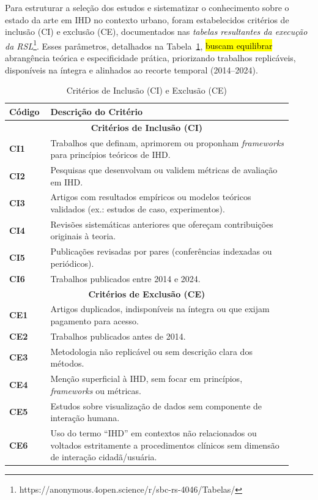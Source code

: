 \documentclass[12pt]{article}
\begin{document}
  Para estruturar a seleção dos estudos e sistematizar o conhecimento sobre o estado da arte em IHD no contexto urbano, foram estabelecidos critérios de inclusão (CI) e exclusão (CE), documentados nas \emph{tabelas resultantes da execução da RSL}\footnote{https://anonymous.4open.science/r/sbc-rs-4046/Tabelas/}. Esses parâmetros, detalhados na Tabela~\ref{tab:criterios}, \hl{buscam equilibrar } abrangência teórica e especificidade prática, priorizando trabalhos replicáveis, disponíveis na íntegra e alinhados ao recorte temporal (2014–2024).

\begin{table}[H]
\centering
\caption{Critérios de Inclusão (CI) e Exclusão (CE)}
\label{tab:criterios}
\small
\begin{tabular}{p{0.12\linewidth} p{0.8\linewidth}}
\hline
\textbf{Código} & \textbf{Descrição do Critério} \\ 
\hline
\multicolumn{2}{c}{\textbf{Critérios de Inclusão (CI)}} \\ 
\hline
\textbf{CI1} & Trabalhos que definam, aprimorem ou proponham \textit{frameworks} para princípios teóricos de IHD. \\ 
\textbf{CI2} & Pesquisas que desenvolvam ou validem métricas de avaliação em IHD. \\ 
\textbf{CI3} & Artigos com resultados empíricos ou modelos teóricos validados (ex.: estudos de caso, experimentos). \\ 
\textbf{CI4} & Revisões sistemáticas anteriores que ofereçam contribuições originais à teoria. \\ 
\textbf{CI5} & Publicações revisadas por pares (conferências indexadas ou periódicos). \\
\textbf{CI6} & Trabalhos publicados entre 2014 e 2024. \\
\hline
\multicolumn{2}{c}{\textbf{Critérios de Exclusão (CE)}} \\
\hline
\textbf{CE1} & Artigos duplicados, indisponíveis na íntegra ou que exijam pagamento para acesso. \\
\textbf{CE2} & Trabalhos publicados antes de 2014. \\
\textbf{CE3} & Metodologia não replicável ou sem descrição clara dos métodos. \\
\textbf{CE4} & Menção superficial à IHD, sem focar em princípios, \textit{frameworks} ou métricas. \\
\textbf{CE5} & Estudos sobre visualização de dados sem componente de interação humana. \\
\textbf{CE6} & Uso do termo ``IHD'' em contextos não relacionados ou voltados estritamente a procedimentos clínicos sem dimensão de interação cidadã/usuária. \\
\hline
\end{tabular}
\end{table}
\end{document}
